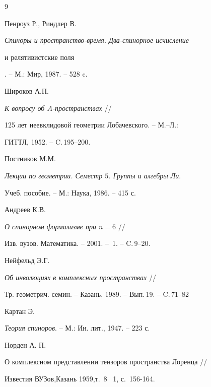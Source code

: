 \begin{thebibliography}{9}







Пенроуз Р., Риндлер В.


{\em Спиноры и пространство-время. Два-спинорное исчисление


и релятивистские поля}. -- М.: Мир, 1987. -- 528 c.




Широков А.П.


{\em К вопросу об $A$-пространствах} //


125 лет неевклидовой геометрии Лобачевского. -- М.--Л.:


ГИТТЛ, 1952. -- C.\,195--200.




Постников М.М.


{\em Лекции по геометрии. Семестр $5$. Группы и алгебры Ли}.


Учеб. пособие. -- М.: Наука, 1986. -- 415 с.




Андреев К.В.


{\em О спинорном формализме при $n=6$} //


Изв. вузов. Математика. -- 2001. -- \No\,1. -- C.\,9--20.




Нейфельд Э.Г.


{\em Об инволюциях в комплексных пространствах} //


Тр. геометрич. семин. -- Казань, 1989. -- Вып.\,19. -- C.\,71--82




Картан Э.


{\em Теория спиноров}. -- М.: Ин. лит., 1947. -- 223 с.





\end{thebibliography}





\vskip 2cm












\label{end}













{\sc Норден А. П.}


О комплексном представлении тензоров пространства Лоренца //


Известия ВУЗов,Казань 1959,т.~8 \No~1, с.~156-164.





